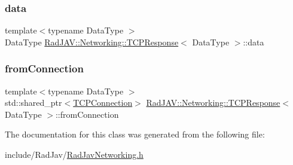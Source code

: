 \subsubsection{\texorpdfstring{data}{data}}
{\footnotesize\ttfamily template$<$typename Data\+Type $>$ \\
Data\+Type \mbox{\hyperlink{class_rad_j_a_v_1_1_networking_1_1_t_c_p_response}{Rad\+J\+A\+V\+::\+Networking\+::\+T\+C\+P\+Response}}$<$ Data\+Type $>$\+::data}

\mbox{\label{class_rad_j_a_v_1_1_networking_1_1_t_c_p_response_a256974dab7fab1800d974135d8aa1f47}} 
\subsubsection{\texorpdfstring{from\+Connection}{fromConnection}}
{\footnotesize\ttfamily template$<$typename Data\+Type $>$ \\
std\+::shared\+\_\+ptr$<$\mbox{\hyperlink{class_rad_j_a_v_1_1_networking_1_1_t_c_p_connection}{T\+C\+P\+Connection}}$>$ \mbox{\hyperlink{class_rad_j_a_v_1_1_networking_1_1_t_c_p_response}{Rad\+J\+A\+V\+::\+Networking\+::\+T\+C\+P\+Response}}$<$ Data\+Type $>$\+::from\+Connection}



The documentation for this class was generated from the following file\+:\begin{DoxyCompactItemize}
\item 
include/\+Rad\+Jav/\mbox{\hyperlink{_rad_jav_networking_8h}{Rad\+Jav\+Networking.\+h}}\end{DoxyCompactItemize}
